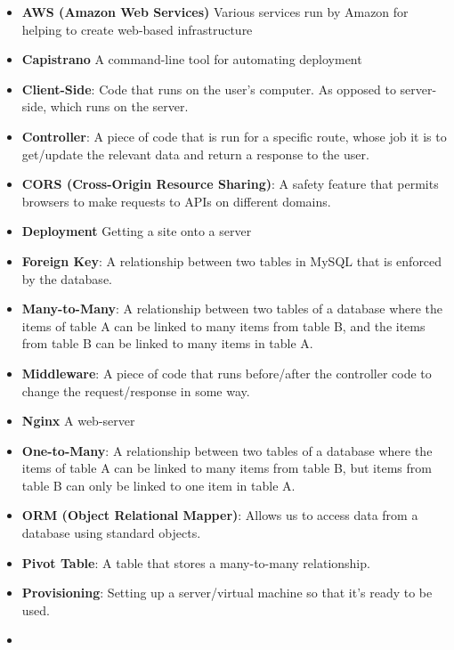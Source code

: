 \begin{itemize}[leftmargin=*]
    \item
        \textbf{AWS (Amazon Web Services)}
        Various services run by Amazon for helping to create web-based infrastructure
    \item
        \textbf{Capistrano}
        A command-line tool for automating deployment
    \item
        \textbf{Client-Side}:
        Code that runs on the user's computer. As opposed to server-side, which runs on the server.
    \item
        \textbf{Controller}:
        A piece of code that is run for a specific route, whose job it is to get/update the relevant data and return a response to the user.
    \item
        \textbf{CORS (Cross-Origin Resource Sharing)}:
        A safety feature that permits browsers to make requests to APIs on different domains.
    \item
        \textbf{Deployment}
        Getting a site onto a server
    \item
        \textbf{Foreign Key}:
        A relationship between two tables in MySQL that is enforced by the database.
    \item
        \textbf{Many-to-Many}:
        A relationship between two tables of a database where the items of table A can be linked to many items from table B, and the items from table B can be linked to many items in table A.
    \item
        \textbf{Middleware}:
        A piece of code that runs before/after the controller code to change the request/response in some way.
    \item
        \textbf{Nginx}
        A web-server
    \item
        \textbf{One-to-Many}:
        A relationship between two tables of a database where the items of table A can be linked to many items from table B, but items from table B can only be linked to one item in table A.
    \item
        \textbf{ORM (Object Relational Mapper)}:
        Allows us to access data from a database using standard objects.
    \item
        \textbf{Pivot Table}:
        A table that stores a many-to-many relationship.
    \item
        \textbf{Provisioning}:
        Setting up a server/virtual machine so that it's ready to be used.
    \item

\end{itemize}

